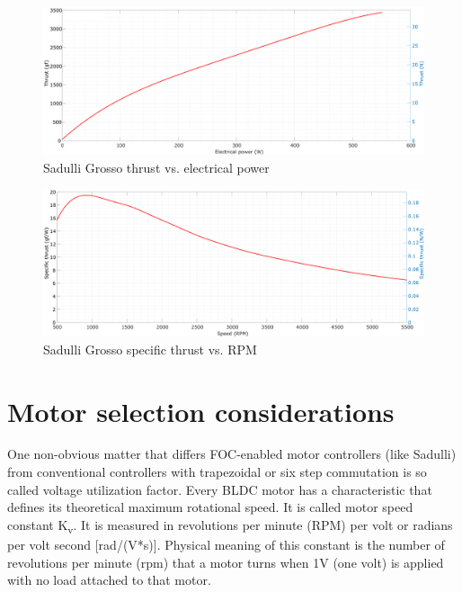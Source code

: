 \begin{figure}[!hbt]
    \centerline{\includegraphics[width=1\textwidth]{figures/thrust_graphs/grosso_thrust-power.pdf}}
    \caption{Sadulli Grosso thrust  vs. electrical power}
\end{figure}

\begin{figure}[!hbt]
    \centerline{\includegraphics[width=1\textwidth]{figures/thrust_graphs/grosso_specific_thrust-rpm.pdf}}
    \caption{Sadulli Grosso specific thrust vs. RPM}
\end{figure}

\newpage

\section{Motor selection considerations}{\label{sec:motor_selection}}

One non-obvious matter that differs FOC-enabled motor controllers (like Sadulli) from conventional controllers
with trapezoidal or six step commutation is so called voltage utilization factor.
Every BLDC motor has a characteristic that defines its theoretical maximum rotational speed.
It is called  motor speed constant K\textsubscript{v}.
It is measured in revolutions per minute (RPM) per volt or radians per volt second [rad/(V*s)].
Physical meaning of this constant is the number of revolutions per minute (rpm) that a motor turns when 1V (one volt)
is applied with no load attached to that motor.

